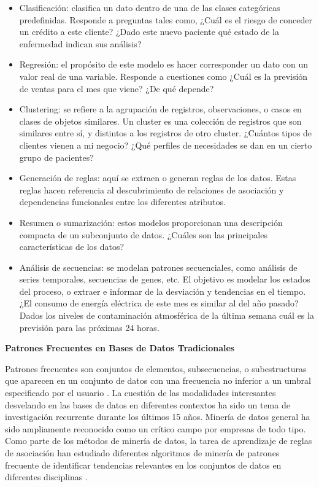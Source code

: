 \begin{itemize}
 \item Clasificación: clasifica un dato dentro de una de las clases categóricas predefinidas. Responde a preguntas tales como, 
 ¿Cuál es el riesgo de conceder un crédito a este cliente? ¿Dado este nuevo paciente qué estado de la enfermedad indican sus análisis?
 \item Regresión: el propósito de este modelo es hacer corresponder un dato con un valor real de una variable. Responde a cuestiones como
¿Cuál es la previsión de ventas para el mes que viene? ¿De qué depende?
 \item Clustering: se refiere a la agrupación de registros, observaciones, o casos en clases de objetos similares. Un cluster es una colección
de registros que son similares entre sí, y distintos a los registros de otro cluster. ¿Cuántos tipos de clientes vienen a mi negocio? 
¿Qué perfiles de necesidades se dan en un cierto grupo de pacientes?
\item Generación de reglas: aquí se extraen o generan reglas de los datos. Estas reglas hacen referencia al descubrimiento de relaciones de 
asociación y dependencias funcionales entre los diferentes atributos.
\item Resumen o sumarización: estos modelos proporcionan una descripción compacta de un subconjunto de datos. ¿Cuáles son las
principales características de los datos?
\item Análisis de secuencias: se modelan patrones secuenciales, como análisis de series temporales, secuencias de genes, etc. El objetivo 
es modelar los estados del proceso, o extraer e informar de la desviación y tendencias en el tiempo. ¿El consumo de energía eléctrica de este 
mes es similar al del año pasado? Dados los niveles de contaminación atmosférica de la última semana cuál es la previsión para las próximas 24 horas.
\end{itemize}


\textbf{Patrones Frecuentes en Bases de Datos Tradicionales}

Patrones frecuentes son conjuntos de elementos, subsecuencias, o subestructuras que aparecen en un conjunto de datos con una
frecuencia no inferior a un umbral especificado por el usuario \cite{han2007frequent}. La cuestión de las modalidades 
interesantes desvelando en las bases de datos en diferentes contextos ha sido un tema de investigación
recurrente durante los últimos 15 años. Minería de datos general ha sido ampliamente reconocido como un
crítico campo por empresas de todo tipo. Como parte de los métodos de minería de datos, la tarea de aprendizaje 
de reglas de asociación han estudiado diferentes algoritmos de minería de patrones frecuente de identificar 
tendencias relevantes en los conjuntos de datos en diferentes disciplinas \cite{creighton2003mining}. 

